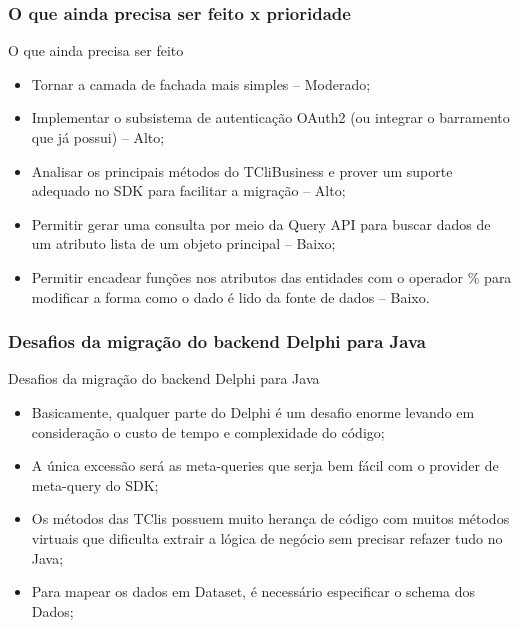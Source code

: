 \documentclass{beamer}
\begin{document}
\begin{frame}
\frametitle{O que ainda precisa ser feito x prioridade}

\begin{exampleblock}{O que ainda precisa ser feito}
	
	\begin{itemize}
		\item<1->Tornar a camada de fachada mais simples -- Moderado;
		\item<1->Implementar o subsistema de autenticação OAuth2 (ou integrar o barramento que já possui) -- Alto;
		\item<1->Analisar os principais métodos do TCliBusiness e prover um suporte adequado no SDK para facilitar a migração -- Alto;
		\item<1->Permitir gerar uma consulta por meio da Query API para buscar dados de um atributo lista de um objeto principal -- Baixo;
		\item<1->Permitir encadear funções nos atributos das entidades com o operador \% para modificar a forma como o dado é lido da fonte de dados -- Baixo.
		
		
	\end{itemize}
	
\end{exampleblock}







\end{frame}




\begin{frame}
\frametitle{Desafios da migração do backend Delphi para Java}

\begin{exampleblock}{Desafios da migração do backend Delphi para Java}
	
	\begin{itemize}
		\item<1->Basicamente, qualquer parte do Delphi é um desafio enorme levando em consideração o custo de tempo e complexidade do código;
		\item<1->A única excessão será as meta-queries que serja bem fácil com o provider de meta-query do SDK;
		\item<1->Os métodos das TClis possuem muito herança de código com muitos métodos virtuais que dificulta extrair a lógica de negócio
		sem precisar refazer tudo no Java;
		\item<1->Para mapear os dados em Dataset, é necessário especificar o schema dos Dados;
	\end{itemize}
	
\end{exampleblock}

\end{frame}
\end{document}
